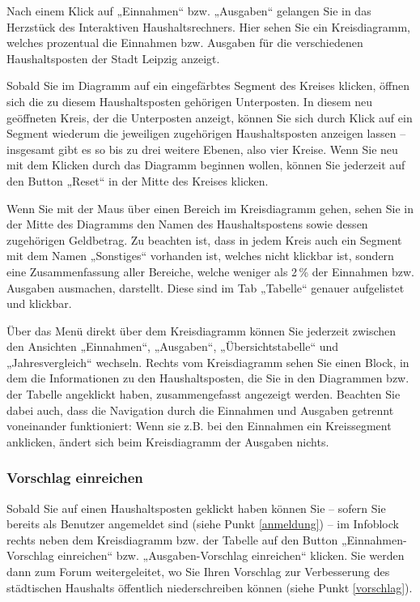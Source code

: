 \documentclass[a4paper,11pt,twoside]{article}
\begin{document}
Nach einem Klick auf „Einnahmen“ bzw. „Ausgaben“ gelangen Sie in das Herzstück
des Interaktiven Haushaltsrechners. Hier sehen Sie ein Kreisdiagramm, welches
prozentual die Einnahmen bzw. Ausgaben für die verschiedenen Haushaltsposten
der Stadt Leipzig anzeigt.
 
Sobald Sie im Diagramm auf ein eingefärbtes Segment des Kreises klicken,
öffnen sich die zu diesem Haushaltsposten gehörigen Unterposten. In diesem neu
geöffneten Kreis, der die Unterposten anzeigt, können Sie sich durch Klick auf
ein Segment wiederum die jeweiligen zugehörigen Haushaltsposten anzeigen
lassen -- insgesamt gibt es so bis zu drei weitere Ebenen, also vier Kreise.
Wenn Sie neu mit dem Klicken durch das Diagramm beginnen wollen, können Sie
jederzeit auf den Button „Reset“ in der Mitte des Kreises klicken.

Wenn Sie mit der Maus \"uber einen Bereich im Kreisdiagramm gehen, sehen Sie
in der Mitte des Diagramms den Namen des Haushaltspostens sowie dessen
zugehörigen Geldbetrag. Zu beachten ist, dass in jedem Kreis auch ein Segment
mit dem Namen „Sonstiges“ vorhanden ist, welches nicht klickbar ist, sondern
eine Zusammenfassung aller Bereiche, welche weniger als 2\,\% der Einnahmen
bzw. Ausgaben ausmachen, darstellt. Diese sind im Tab „Tabelle“ genauer
aufgelistet und klickbar.

Über das Menü direkt über dem Kreisdiagramm können Sie jederzeit zwischen den
Ansichten „Einnahmen“, „Ausgaben“, „Übersichtstabelle“ und „Jahresvergleich“
wechseln. Rechts vom Kreisdiagramm sehen Sie einen Block, in dem die
Informationen zu den Haushaltsposten, die Sie in den Diagrammen bzw. der
Tabelle angeklickt haben, zusammengefasst angezeigt werden.  Beachten Sie
dabei auch, dass die Navigation durch die Einnahmen und Ausgaben getrennt
voneinander funktioniert: Wenn sie z.B. bei den Einnahmen ein Kreissegment
anklicken, ändert sich beim Kreisdiagramm der Ausgaben nichts.
\enlargethispage{2em}

\subsubsection{Vorschlag einreichen}
Sobald Sie auf einen Haushaltsposten geklickt haben können Sie -- sofern Sie
bereits als Benutzer angemeldet sind (siehe Punkt \ref{anmeldung}) -- im
Infoblock rechts neben dem Kreisdiagramm bzw. der Tabelle auf den Button
„Einnahmen-Vorschlag einreichen“ bzw. „Ausgaben-Vorschlag einreichen“
klicken. Sie werden dann zum Forum weitergeleitet, wo Sie Ihren Vorschlag zur
Verbesserung des städtischen Haushalts öffentlich niederschreiben können
(siehe Punkt \ref{vorschlag}).
\end{document}
